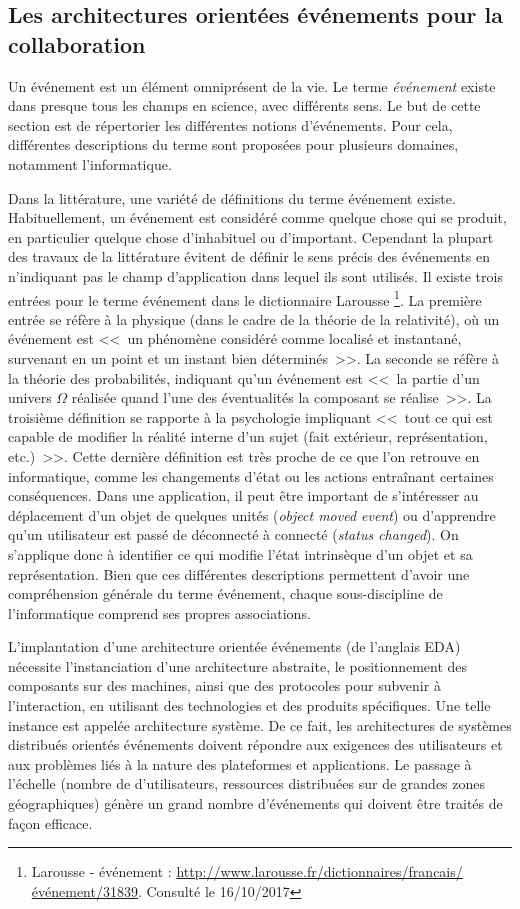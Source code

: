 \subsection{Les architectures orientées événements pour la collaboration}

Un événement est un élément omniprésent de la vie. Le terme \textit{événement} 
existe dans presque tous les champs en science, avec différents sens. Le but de 
cette section est de répertorier les différentes notions d'événements. Pour cela, 
différentes descriptions du terme sont proposées pour plusieurs domaines, notamment
l'informatique. 

Dans la littérature, une variété de définitions du terme événement existe. 
Habituellement, un événement est considéré comme quelque chose qui 
\og se produit\fg{}, en particulier quelque chose d'inhabituel ou d'important. 
Cependant la plupart des travaux de la littérature évitent de définir le sens précis 
des événements en n'indiquant pas le champ d'application dans lequel ils sont 
utilisés. 
Il existe trois entrées pour le terme événement dans le dictionnaire Larousse
\footnote{Larousse - événement : \url{http://www.larousse.fr/dictionnaires/francais/événement/31839}. Consulté le 16/10/2017}. 
La première entrée se réfère à la physique (dans le cadre de la théorie 
de la relativité), où un événement est <<~un phénomène considéré comme 
localisé 
et instantané, survenant en un point et un instant bien déterminés~>>. La seconde 
se réfère à la théorie des probabilités, indiquant qu'un événement est <<~la partie 
d'un univers $\Omega$ réalisée quand l'une des éventualités la composant se 
réalise~>>. La troisième définition se rapporte à la psychologie impliquant <<~tout 
ce qui est capable de modifier la réalité interne d'un sujet (fait extérieur, 
représentation, etc.)~>>. Cette dernière définition est très proche de ce que l'on 
retrouve en informatique, comme les changements d'état ou les actions entraînant 
certaines conséquences. Dans une application, il peut être important de 
s'intéresser au déplacement d'un objet de quelques unités (\textit{object moved 
	event}) ou d'apprendre qu'un utilisateur est passé de déconnecté à connecté 
(\textit{status changed}). On s'applique donc à identifier ce qui modifie l'état 
intrinsèque d'un objet et sa représentation. Bien que ces différentes descriptions 
permettent d'avoir une compréhension générale du terme événement, chaque 
sous-discipline de l'informatique comprend 
ses propres associations.

L'implantation d'une architecture orientée événements (de l'anglais \gls{EDA}) 
nécessite l'instanciation d'une 
architecture abstraite, 
le positionnement des composants sur des machines, ainsi que des protocoles 
pour subvenir à l'interaction, en utilisant des technologies et des produits 
spécifiques. Une telle instance est appelée architecture système. De ce fait, les 
architectures de systèmes distribués orientés événements doivent 
répondre aux exigences des utilisateurs et aux problèmes liés à la nature des 
plateformes et applications. 
Le passage à l'échelle (nombre de d'utilisateurs, ressources distribuées sur de 
grandes zones géographiques) génère un grand nombre d'événements qui doivent 
être traités de façon efficace. 

